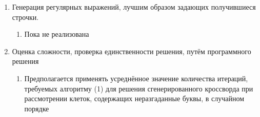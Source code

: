 \documentclass[12pt]{article}
\begin{document}
\begin{enumerate}
\begin{enumerate}
\end{enumerate} 
\item Генерация регулярных выражений, лучшим образом задающих получившиеся строчки.
\begin{enumerate} 
\item Пока не реализована
\end{enumerate} 
\item Оценка сложности, проверка единственности решения, путём программного решения
\begin{enumerate} 
\item Предполагается применять усреднённое значение количества итераций, требуемых алгоритму (1) для решения сгенерированного кроссворда при рассмотрении клеток, содержащих неразгаданные буквы, в случайном порядке
\end{enumerate} 
\end{enumerate} 


    \newpage %
    
\end{document}
